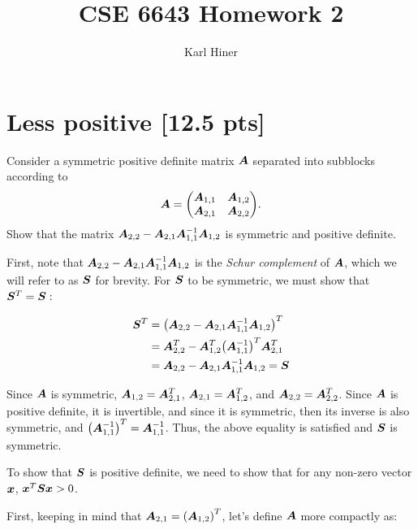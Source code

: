 \documentclass[twoside,10pt]{article}
\begin{document}
\title{CSE 6643 Homework 2}
\author{Karl Hiner}
\date{}
\maketitle

\section{Less positive [12.5 pts]} 

Consider a symmetric positive definite matrix $\bm{A}$ separated into subblocks according to
\begin{equation*}
  \mtx{A} = \begin{pmatrix}
    \mtx{A}_{1, 1} & \mtx{A}_{1, 2} \\
    \mtx{A}_{2, 1} & \mtx{A}_{2, 2}
  \end{pmatrix}.
\end{equation*}
Show that the matrix $\bm{A}_{2,2} - \bm{A}_{2,1} \bm{A}_{1,1}^{-1} \bm{A}_{1,2}$ is symmetric and positive definite. 

\quad First, note that $\bm{A}_{2,2} - \bm{A}_{2,1} \bm{A}_{1,1}^{-1} \bm{A}_{1,2}$ is the \textit{Schur complement} of $\bm{A}$, which we will refer to as $\bm{S}$ for brevity.
For $\bm{S}$ to be symmetric, we must show that $\bm{S}^T = \bm{S}:$ 

\begin{align*}
\mtx{S}^T &= \left(\mtx{A}_{2,2} - \mtx{A}_{2,1} \mtx{A}_{1,1}^{-1} \mtx{A}_{1,2}\right)^T\\
&= \mtx{A}_{2,2}^T - \mtx{A}_{1,2}^T \left(\mtx{A}_{1,1}^{-1}\right)^T \mtx{A}_{2,1}^T \\
&= \mtx{A}_{2,2} - \mtx{A}_{2,1} \mtx{A}_{1,1}^{-1} \mtx{A}_{1,2} = \mtx{S}
\end{align*}

\quad Since $\bm{A}$ is symmetric, $\bm{A}_{1,2} = \bm{A}_{2,1}^T$, $\bm{A}_{2,1} = \bm{A}_{1,2}^T$, and $\bm{A}_{2,2} = \bm{A}_{2,2}^T$.
Since $\bm{A}$ is positive definite, it is invertible, and since it is symmetric, then its inverse is also symmetric, and $\left(\mtx{A}_{1,1}^{-1}\right)^T = \mtx{A}_{1,1}^{-1}$.
Thus, the above equality is satisfied and $\bm{S}$ is symmetric.

To show that $\bm{S}$ is positive definite, we need to show that for any non-zero vector $\bm{x}$, $\bm{x}^T \bm{S} \bm{x} > 0$.

First, keeping in mind that $\mtx{A}_{2,1} = \left(\mtx{A}_{1,2}\right)^T$, let's define $\bm{A}$ more compactly as:
\end{document}

